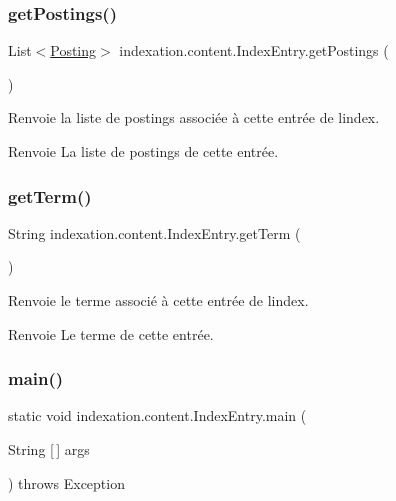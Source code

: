 \subsubsection{\texorpdfstring{get\+Postings()}{getPostings()}}
{\footnotesize\ttfamily List$<$\hyperlink{classindexation_1_1content_1_1Posting}{Posting}$>$ indexation.\+content.\+Index\+Entry.\+get\+Postings (\begin{DoxyParamCaption}{ }\end{DoxyParamCaption})}

Renvoie la liste de postings associée à cette entrée de l\textquotesingle{}index.

\begin{DoxyReturn}{Renvoie}
La liste de postings de cette entrée. 
\end{DoxyReturn}
\mbox{\label{classindexation_1_1content_1_1IndexEntry_aeeaadb85fdb94031de944c67bb80ed2d}} 
\subsubsection{\texorpdfstring{get\+Term()}{getTerm()}}
{\footnotesize\ttfamily String indexation.\+content.\+Index\+Entry.\+get\+Term (\begin{DoxyParamCaption}{ }\end{DoxyParamCaption})}

Renvoie le terme associé à cette entrée de l\textquotesingle{}index.

\begin{DoxyReturn}{Renvoie}
Le terme de cette entrée. 
\end{DoxyReturn}
\mbox{\label{classindexation_1_1content_1_1IndexEntry_a9f8de2f0eb50d5f6480bf4acdb579b29}} 
\subsubsection{\texorpdfstring{main()}{main()}}
{\footnotesize\ttfamily static void indexation.\+content.\+Index\+Entry.\+main (\begin{DoxyParamCaption}\item[{String \mbox{[}$\,$\mbox{]}}]{args }\end{DoxyParamCaption}) throws Exception\hspace{0.3cm}{\ttfamily [static]}}

